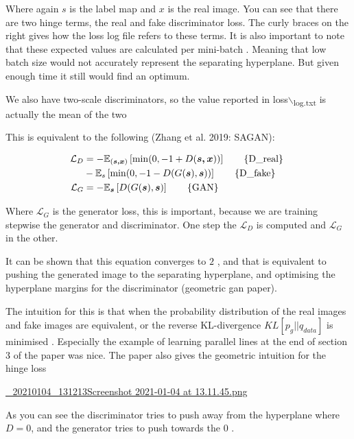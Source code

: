 \documentclass{memoir}
\begin{document}
Where again \(s\) is the label map and \(x\) is the real image. You can see
that there are two hinge terms, the real and fake discriminator loss. The curly
braces on the right gives how the loss log file refers to these terms. It is
also important to note that these expected values are calculated per mini-batch
\cite{limGeometricGAN2017}. Meaning that low batch size would not accurately
represent the separating hyperplane. But given enough time it still would find
an optimum.

We also have two-scale discriminators, so the value reported in loss$\backslash$\textsubscript{log.txt} is
actually the mean of the two

This is equivalent to the following (Zhang et al. 2019: SAGAN):

\begin{align}
\mathcal{ L }_{D} &= - \mathbb{E}_{(\boldsymbol{s,x})} \left[ \min(0, -1 + D(\boldsymbol{s,x})) \right] \tag*{\{D\_real\} }\\
 &- \mathbb{E}_{s} \left[ \min(0, -1 - D(G(\boldsymbol{s}) , \boldsymbol{s})) \right] \tag*{\{D\_fake\} }\\
\mathcal{ L }_{G} &= - \mathbb{E}_{\boldsymbol{s} } \left[ D(G(\boldsymbol{s}) , \boldsymbol{s}) \right] \tag*{\{GAN\} }
\end{align}

Where \(\mathcal{ L }_{G}\) is the generator loss, this is important, because
we are training stepwise the generator and discriminator. One step the
\(\mathcal{ L }_{D}\) is computed and \(\mathcal{ L }_{G}\) in the other.


It can be shown that this equation converges to \(2\) , and that is equivalent
to pushing the generated image to the separating hyperplane, and optimising the
hyperplane margins for the discriminator (geometric gan paper).

The intuition for this is that when the probability distribution of the real
images and fake images are equivalent, or the reverse KL-divergence \(KL \left[ p_{g} || q_{data}\right]\)
is minimised \cite{miyatoSpectralNormalizationGenerative2018}. Especially the
example of learning parallel lines at the end of section 3 of the paper was
nice. The paper also gives the geometric intuition for the hinge loss



\url{\_20210104\_131213Screenshot 2021-01-04 at 13.11.45.png}

As you can see the discriminator tries to push away from the hyperplane where \(D = 0\),
and the generator tries to push towards the \(0\) .




\end{document}
